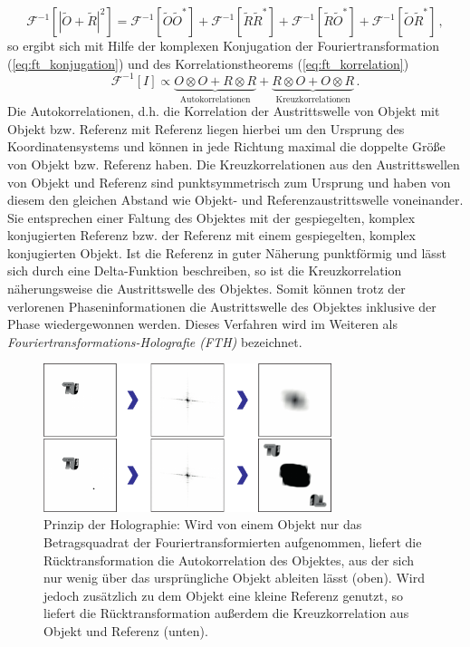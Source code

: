 \begin{equation}
	\mathscr{F}^{-1}\left[\left|\tilde{O}+\tilde{R}\right|^2\right]=
	\mathscr{F}^{-1}\left[\tilde{O}\tilde{O}^*\right]+
	\mathscr{F}^{-1}\left[\tilde{R}\tilde{R}^*\right]+
	\mathscr{F}^{-1}\left[\tilde{R}\tilde{O}^*\right]+
	\mathscr{F}^{-1}\left[\tilde{O}\tilde{R}^*\right]\,,
\end{equation}
so ergibt sich mit Hilfe der komplexen Konjugation der Fouriertransformation (\ref{eq:ft_konjugation}) und des Korrelationstheorems (\ref{eq:ft_korrelation})
\begin{equation}
	\mathscr{F}^{-1}[I]\propto \underbrace{O \otimes O + R\otimes R}_{\text{Autokorrelationen}}+\underbrace{R\otimes O+ O\otimes R}_{\text {Kreuzkorrelationen}}\,.
\end{equation}
Die Autokorrelationen, d.h. die Korrelation der Austrittswelle von Objekt mit Objekt bzw. Referenz mit Referenz liegen hierbei um den Ursprung des Koordinatensystems und können in jede Richtung maximal die doppelte Größe von Objekt bzw. Referenz haben. Die Kreuzkorrelationen aus den Austrittswellen von Objekt und Referenz sind punktsymmetrisch zum Ursprung und haben von diesem den gleichen Abstand wie Objekt- und Referenzaustrittswelle voneinander.
Sie  entsprechen einer Faltung des Objektes mit der gespiegelten, komplex konjugierten Referenz bzw. der Referenz mit einem gespiegelten, komplex konjugierten Objekt. Ist die Referenz in guter Näherung punktförmig und lässt sich durch eine Delta-Funktion beschreiben, so ist die Kreuzkorrelation näherungsweise die Austrittswelle des Objektes. Somit können trotz der verlorenen Phaseninformationen die Austrittswelle des Objektes inklusive der Phase wiedergewonnen werden. Dieses Verfahren wird im Weiteren als \textit{Fouriertransformations-Holografie (FTH)} bezeichnet.

\begin{figure}
	\centering
	\includegraphics[width=0.75\textwidth]{images/fth.pdf}
	\caption[Prinzip FTP]{Prinzip der Holographie: Wird von einem Objekt nur das Betragsquadrat der Fouriertransformierten aufgenommen, liefert die Rücktransformation die Autokorrelation des Objektes, aus der sich nur wenig über das ursprüngliche Objekt ableiten lässt (oben). Wird jedoch zusätzlich zu dem Objekt eine kleine Referenz genutzt, so liefert die Rücktransformation außerdem die Kreuzkorrelation aus Objekt und Referenz (unten).}
	\label{fig:fth}
\end{figure}

